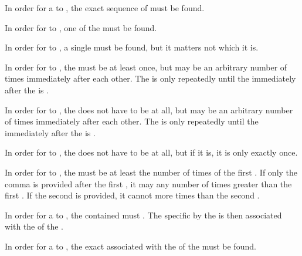 \noindent In order for a  to , the exact sequence of  must be found.

\noindent In order for  to , one of the  must be found.

\noindent In order for  to , a single  must be found, but it matters not which  it is.

\noindent In order for  to , the  must be  at least once, but may be  an arbitrary number of times immediately after each other. The  is only repeatedly  until the  immediately after the  is .

\noindent In order for  to , the  does not have to be  at all, but may be  an arbitrary number of times immediately after each other. The  is only repeatedly  until the  immediately after the  is .

\noindent In order for  to , the  does not have to be  at all, but if it is, it is only  exactly once.

\noindent In order for  to , the  must be  at least the number of times of the first . If only the comma is provided after the first , it may  any number of times greater than the first . If the second  is provided, it cannot  more times than the second .

\noindent In order for a  to , the  contained must . The specific   by the  is then associated with the  of the .

\noindent In order for a  to , the exact  associated with the  of the  must be found.

